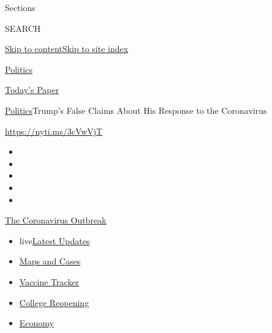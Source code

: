Sections

SEARCH

\protect\hyperlink{site-content}{Skip to
content}\protect\hyperlink{site-index}{Skip to site index}

\href{https://www.nytimes3xbfgragh.onion/section/politics}{Politics}

\href{https://myaccount.nytimes3xbfgragh.onion/auth/login?response_type=cookie\&client_id=vi}{}

\href{https://www.nytimes3xbfgragh.onion/section/todayspaper}{Today's
Paper}

\href{/section/politics}{Politics}\textbar{}Trump's False Claims About
His Response to the Coronavirus

\url{https://nyti.ms/3cVwVjT}

\begin{itemize}
\item
\item
\item
\item
\item
\end{itemize}

\href{https://www.nytimes3xbfgragh.onion/news-event/coronavirus?action=click\&pgtype=Article\&state=default\&region=TOP_BANNER\&context=storylines_menu}{The
Coronavirus Outbreak}

\begin{itemize}
\tightlist
\item
  live\href{https://www.nytimes3xbfgragh.onion/2020/08/03/world/coronavirus-covid-19.html?action=click\&pgtype=Article\&state=default\&region=TOP_BANNER\&context=storylines_menu}{Latest
  Updates}
\item
  \href{https://www.nytimes3xbfgragh.onion/interactive/2020/us/coronavirus-us-cases.html?action=click\&pgtype=Article\&state=default\&region=TOP_BANNER\&context=storylines_menu}{Maps
  and Cases}
\item
  \href{https://www.nytimes3xbfgragh.onion/interactive/2020/science/coronavirus-vaccine-tracker.html?action=click\&pgtype=Article\&state=default\&region=TOP_BANNER\&context=storylines_menu}{Vaccine
  Tracker}
\item
  \href{https://www.nytimes3xbfgragh.onion/2020/08/02/us/covid-college-reopening.html?action=click\&pgtype=Article\&state=default\&region=TOP_BANNER\&context=storylines_menu}{College
  Reopening}
\item
  \href{https://www.nytimes3xbfgragh.onion/live/2020/08/03/business/stock-market-today-coronavirus?action=click\&pgtype=Article\&state=default\&region=TOP_BANNER\&context=storylines_menu}{Economy}
\end{itemize}

